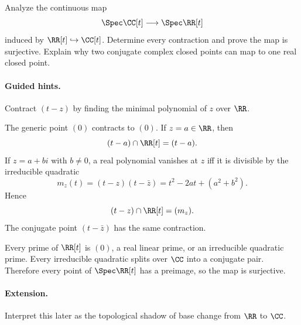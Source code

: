 \begin{problem}
Analyze the continuous map
\[
\Spec\CC[t]\longrightarrow\Spec\RR[t]
\]
induced by $\RR[t]\hookrightarrow\CC[t]$.  Determine every contraction and prove the map is
surjective.  Explain why two conjugate complex closed points can map to one real closed point.
\end{problem}
\paragraph{Guided hints.}
Contract $(t-z)$ by finding the minimal polynomial of $z$ over $\RR$.
\begin{solution}
The generic point $(0)$ contracts to $(0)$.  If $z=a\in\RR$, then
\[
(t-a)\cap\RR[t]=(t-a).
\]
If $z=a+bi$ with $b\neq0$, a real polynomial vanishes at $z$ iff it is divisible by the
irreducible quadratic
\[
m_z(t)=(t-z)(t-\bar z)=t^2-2at+(a^2+b^2).
\]
Hence
\[
(t-z)\cap\RR[t]=(m_z).
\]
The conjugate point $(t-\bar z)$ has the same contraction.

Every prime of $\RR[t]$ is $(0)$, a real linear prime, or an irreducible quadratic prime.
Every irreducible quadratic splits over $\CC$ into a conjugate pair.  Therefore every point
of $\Spec\RR[t]$ has a preimage, so the map is surjective.
\end{solution}
\paragraph{Extension.}
Interpret this later as the topological shadow of base change from $\RR$ to $\CC$.
